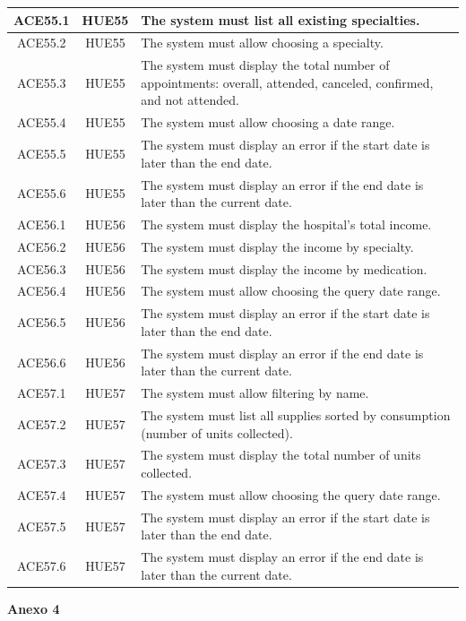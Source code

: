 \documentclass{prgrado}
\begin{document}
\begin{longtable}{|c|c|p{9cm}|}
ACE55.1 & HUE55 & The system must list all existing specialties. \\ \hline
ACE55.2 & HUE55 & The system must allow choosing a specialty. \\ \hline
ACE55.3 & HUE55 & The system must display the total number of appointments: overall, attended, canceled, confirmed, and not attended. \\ \hline
ACE55.4 & HUE55 & The system must allow choosing a date range. \\ \hline
ACE55.5 & HUE55 & The system must display an error if the start date is later than the end date. \\ \hline
ACE55.6 & HUE55 & The system must display an error if the end date is later than the current date. \\ \hline

ACE56.1 & HUE56 & The system must display the hospital's total income. \\ \hline
ACE56.2 & HUE56 & The system must display the income by specialty. \\ \hline
ACE56.3 & HUE56 & The system must display the income by medication. \\ \hline
ACE56.4 & HUE56 & The system must allow choosing the query date range. \\ \hline
ACE56.5 & HUE56 & The system must display an error if the start date is later than the end date. \\ \hline
ACE56.6 & HUE56 & The system must display an error if the end date is later than the current date. \\ \hline

ACE57.1 & HUE57 & The system must allow filtering by name. \\ \hline
ACE57.2 & HUE57 & The system must list all supplies sorted by consumption (number of units collected). \\ \hline
ACE57.3 & HUE57 & The system must display the total number of units collected. \\ \hline
ACE57.4 & HUE57 & The system must allow choosing the query date range. \\ \hline
ACE57.5 & HUE57 & The system must display an error if the start date is later than the end date. \\ \hline
ACE57.6 & HUE57 & The system must display an error if the end date is later than the current date. \\ \hline
\end{longtable}

\newpage
\vspace{0.75\baselineskip}
{\large\bfseries Anexo 4\par}
\vspace{0.25\baselineskip}
\end{document}
